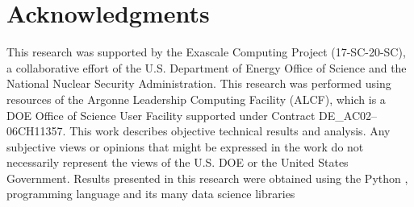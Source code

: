\documentclass[a4paper,11pt]{article}
\begin{document}
\section{\label{sec:ack}Acknowledgments}
%
This research was supported by the Exascale Computing Project (17-SC-20-SC), a
collaborative effort of the U.S. Department of Energy Office of Science and the
National Nuclear Security Administration.
%
This research was performed using resources of the Argonne Leadership Computing
Facility (ALCF), which is a DOE Office of Science User Facility supported under
Contract DE\_AC02--06CH11357. 
%
This work describes objective technical results and analysis.
%
Any subjective views or opinions that might be expressed in the work do not
necessarily represent the views of the U.S. DOE or the United States
Government.
%
Results presented in this research were obtained using the Python
\citep{van1995python}, programming language and its many data science libraries
\cite{%
    matplotlib,
    numpyharris2020array,
    seaborn_michael_waskom_2017_883859,
    ipython4160251%
}



\end{document}
